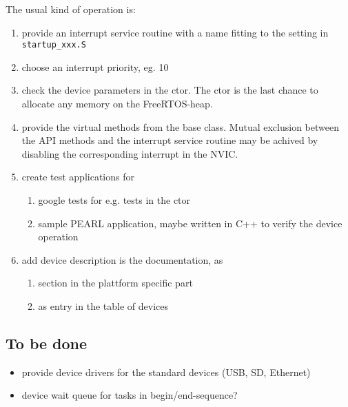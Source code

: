 The usual kind of operation is:
\begin{enumerate}
\item provide an interrupt service routine with a name fitting to the
   setting in \verb|startup_xxx.S|
\item choose an interrupt priority, eg. 10
\item check the device parameters in the ctor. The ctor is the last chance to
   allocate any memory on the FreeRTOS-heap.
\item provide the virtual methods from the base class. Mutual exclusion
   between the API methods and the interrupt service routine may
   be achived by disabling the corresponding interrupt in the NVIC.
\item create test applications for 
  \begin{enumerate}
  \item google tests for e.g. tests in the ctor
  \item sample PEARL application, maybe  written in C++ to verify
        the device operation
  \end{enumerate}
\item add device description is the documentation, as
  \begin{enumerate}
  \item section in the plattform specific part
  \item as entry in the table of devices
  \end{enumerate}
\end{enumerate}




\subsection{To be done}
  \begin{itemize}
  \item provide device drivers for the standard devices (USB, SD, Ethernet)
  \item device wait queue for tasks in begin/end-sequence?
  \end{itemize}


